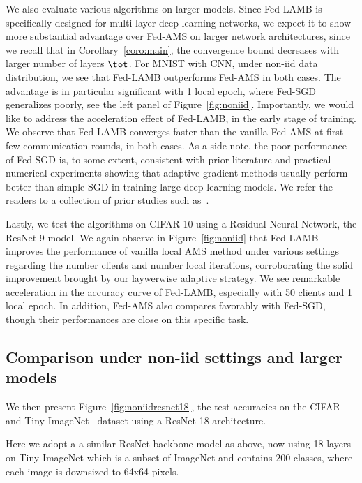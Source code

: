 \documentclass[twoside]{article}
\begin{document}
We also evaluate various algorithms on larger models. 
Since Fed-LAMB is specifically designed for multi-layer deep learning networks, we expect it to show more substantial advantage over Fed-AMS on larger network architectures, since we recall that in Corollary~\ref{coro:main}, the convergence bound decreases with larger number of layers $\tot$.
For MNIST with CNN, under non-iid data distribution, we see that Fed-LAMB outperforms Fed-AMS in both cases. The advantage is in particular significant with 1 local epoch, where Fed-SGD generalizes poorly, see the left panel of Figure~\ref{fig:noniid}. 
Importantly, we would like to address the acceleration effect of Fed-LAMB, in the early stage of training. We observe that Fed-LAMB converges faster than the vanilla Fed-AMS at first few communication rounds, in both cases. 
As a side note, the poor performance of Fed-SGD is, to some extent, consistent with prior literature and practical numerical experiments showing that adaptive gradient methods usually perform better than simple SGD in training large deep learning models. We refer the readers to a collection of prior studies such as~\cite{chen2020toward,reddi2020adaptive}. 

Lastly, we test the algorithms on CIFAR-10 using a Residual Neural Network, the ResNet-9 model. 
We again observe in Figure~\ref{fig:noniid} that Fed-LAMB improves the performance of vanilla local AMS method under various settings regarding the number clients and number local iterations, corroborating the solid improvement brought by our laywerwise adaptive strategy. We see remarkable acceleration in the accuracy curve of Fed-LAMB, especially with 50 clients and 1 local epoch. In addition, Fed-AMS also compares favorably with Fed-SGD, though their performances are close on this specific task. 


\subsection{Comparison under non-iid settings and larger models}

We then present Figure~\ref{fig:noniidresnet18}, the test accuracies on the CIFAR and Tiny-ImageNet~\citep{le2015tiny} dataset using a ResNet-18 architecture. 

Here we adopt a a similar ResNet backbone model as above, now using 18 layers on Tiny-ImageNet which is a subset of ImageNet \citep{deng2009imagenet} and contains 200 classes, where each image is downsized to 64x64 pixels.
\end{document}
